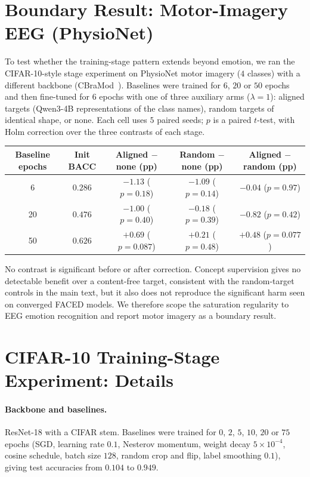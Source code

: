 \begin{revblock}
\section{Boundary Result: Motor-Imagery EEG (PhysioNet)}
\label{app:physionet}
To test whether the training-stage pattern extends beyond emotion, we ran
the CIFAR-10-style stage experiment on PhysioNet motor imagery ($4$
classes) with a different backbone (CBraMod~\citep{wang2025cbramod}).
Baselines were trained for $6$, $20$ or $50$ epochs and then fine-tuned
for $6$ epochs with one of three auxiliary arms ($\lambda{=}1$): aligned
targets (Qwen3-4B representations of the class names), random targets of
identical shape, or none. Each cell uses $5$ paired seeds; $p$ is a paired
$t$-test, with Holm correction over the three contrasts of each stage.

\begin{center}
\small
\begin{tabular}{ccccc}
\toprule
Baseline epochs & Init BACC & Aligned $-$ none (pp) & Random $-$ none (pp) & Aligned $-$ random (pp) \\
\midrule
6 & $0.286$ & ${-}1.13$ ($p{=}0.18$) & ${-}1.09$ ($p{=}0.14$) & ${-}0.04$ ($p{=}0.97$) \\
20 & $0.476$ & ${-}1.00$ ($p{=}0.40$) & ${-}0.18$ ($p{=}0.39$) & ${-}0.82$ ($p{=}0.42$) \\
50 & $0.626$ & ${+}0.69$ ($p{=}0.087$) & ${+}0.21$ ($p{=}0.48$) & ${+}0.48$ ($p{=}0.077$) \\
\bottomrule
\end{tabular}
\end{center}
No contrast is significant before or after correction. Concept supervision
gives no detectable benefit over a content-free target, consistent with the
random-target controls in the main text, but it also does not reproduce the
significant harm seen on converged FACED models. We therefore scope the
saturation regularity to EEG emotion recognition and report motor imagery
as a boundary result.

\section{CIFAR-10 Training-Stage Experiment: Details}
\label{app:cifar-details}
\paragraph{Backbone and baselines.} ResNet-18 with a CIFAR stem. Baselines
were trained for $0$, $2$, $5$, $10$, $20$ or $75$ epochs (SGD, learning rate
$0.1$, Nesterov momentum, weight decay $5{\times}10^{-4}$, cosine schedule,
batch size $128$, random crop and flip, label smoothing $0.1$), giving test
accuracies from $0.104$ to $0.949$.

\end{revblock}
